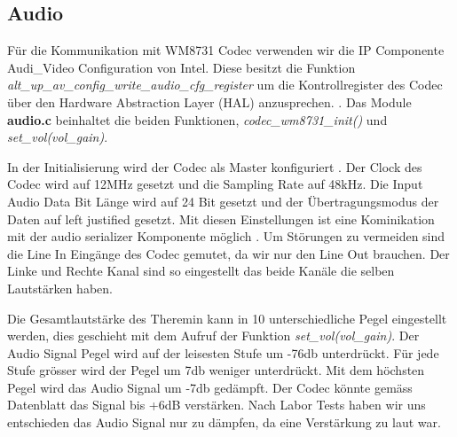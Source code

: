 \subsection{Audio}\label{subsec:audio}

Für die Kommunikation mit WM8731 Codec verwenden wir die IP Componente Audi\_Video Configuration von Intel. Diese besitzt die Funktion 
\textit{alt\_up\_av\_config\_write\_audio\_cfg\_register} um die Kontrollregister des Codec über den Hardware Abstraction Layer (HAL) anzusprechen. .
Das Module \textbf{audio.c} beinhaltet die beiden Funktionen, \textit{codec\_wm8731\_init()} und \textit{set\_vol(vol\_gain)}. 

In der Initialisierung wird der Codec als Master konfiguriert . Der Clock des Codec wird auf 12MHz gesetzt und die Sampling Rate auf 48kHz. Die Input Audio Data Bit Länge wird auf 24 Bit gesetzt und der Übertragungsmodus der Daten auf left justified gesetzt. Mit diesen Einstellungen ist eine Kominikation mit der audio serializer Komponente möglich .
Um Störungen zu vermeiden sind die Line In Eingänge des Codec gemutet, da wir nur den Line Out brauchen. Der Linke und Rechte Kanal sind so eingestellt das beide Kanäle die selben Lautstärken haben. 

Die Gesamtlautstärke des Theremin kann in 10 unterschiedliche Pegel eingestellt werden, dies geschieht mit dem Aufruf der Funktion \textit{set\_vol(vol\_gain)}. Der Audio Signal Pegel wird auf der leisesten Stufe um -76db unterdrückt. Für jede Stufe grösser wird der Pegel um 7db weniger unterdrückt. Mit dem höchsten Pegel wird das Audio Signal um -7db gedämpft. Der Codec könnte gemäss Datenblatt das Signal bis +6dB verstärken. Nach Labor Tests haben wir uns entschieden das Audio Signal nur zu dämpfen, da eine Verstärkung zu laut war.
